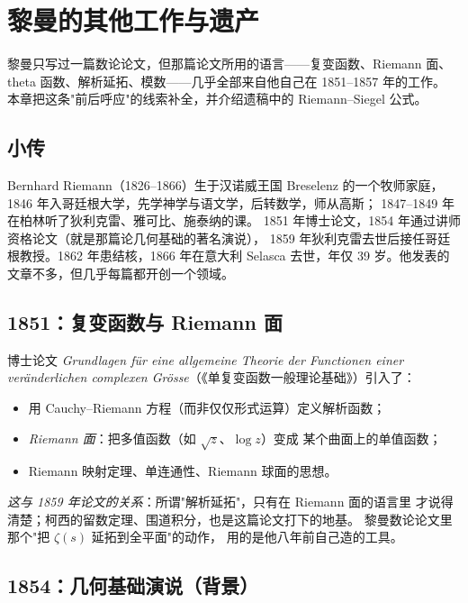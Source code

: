 \chapter{黎曼的其他工作与遗产}
\label{chap:legacy}

\begin{keybox}[本章要点]
黎曼只写过一篇数论论文，但那篇论文所用的语言——复变函数、Riemann 面、
theta 函数、解析延拓、模数——几乎全部来自他自己在 1851--1857 年的工作。
本章把这条"前后呼应"的线索补全，并介绍遗稿中的 Riemann--Siegel 公式。
\end{keybox}

\section{小传}
\label{sec:05-life}

Bernhard Riemann（1826--1866）生于汉诺威王国 Breselenz 的一个牧师家庭，
1846 年入哥廷根大学，先学神学与语文学，后转数学，师从高斯；
1847--1849 年在柏林听了狄利克雷、雅可比、施泰纳的课。
1851 年博士论文，1854 年通过讲师资格论文（就是那篇论几何基础的著名演说），
1859 年狄利克雷去世后接任哥廷根教授。1862 年患结核，1866 年在意大利
Selasca 去世，年仅 39 岁。他发表的文章不多，但几乎每篇都开创一个领域。

\section{1851：复变函数与 Riemann 面}
\label{sec:05-1851}

博士论文 \emph{Grundlagen f\"ur eine allgemeine Theorie der Functionen einer
ver\"anderlichen complexen Gr\"osse}（《单复变函数一般理论基础》）引入了：

\begin{itemize}
  \item 用 Cauchy--Riemann 方程（而非仅仅形式运算）定义解析函数；
  \item \emph{Riemann 面}：把多值函数（如 $\sqrt z$、$\log z$）变成
        某个曲面上的单值函数；
  \item Riemann 映射定理、单连通性、Riemann 球面的思想。
\end{itemize}

\emph{这与 1859 年论文的关系}：所谓"解析延拓"，只有在 Riemann 面的语言里
才说得清楚；柯西的留数定理、围道积分，也是这篇论文打下的地基。
黎曼数论论文里那个"把 $\zeta(s)$ 延拓到全平面"的动作，
用的是他八年前自己造的工具。

\section{1854：几何基础演说（背景）}
\label{sec:05-1854}

